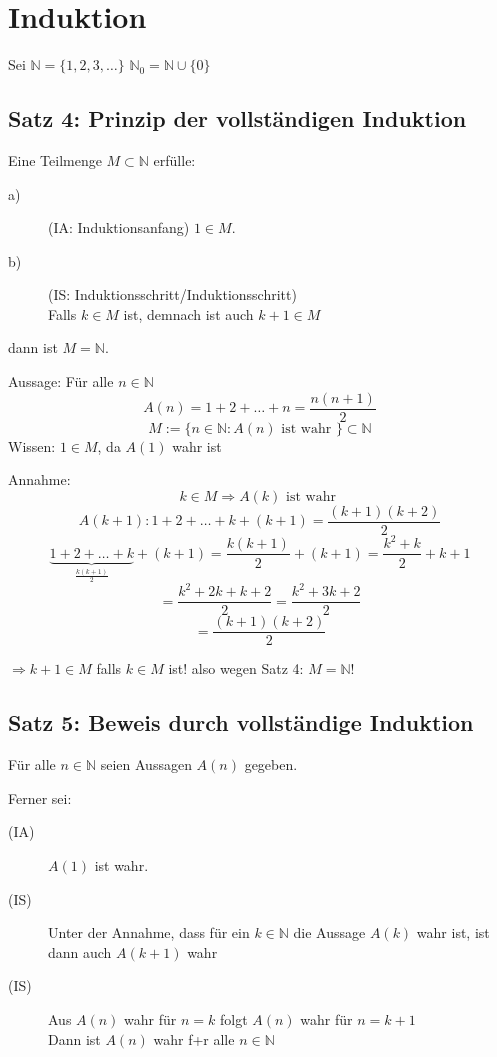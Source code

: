 \documentclass[fleqn]{scrbook}
\newenvironment{example}{{\bfseries Beispiel }}{}
\begin{document}
\section{Induktion}

Sei $\mathbb{N} = \{1,2,3,\ldots\}$
$\mathbb{N}_0=\mathbb{N} \cup \{0\}$

\subsection{Satz 4: Prinzip der vollständigen Induktion}

Eine Teilmenge $M \subset \mathbb{N}$ erfülle:

\begin{description}
 \item[a)] (IA: Induktionsanfang) $1 \in M$.
 \item[b)] (IS: Induktionsschritt/Induktionsschritt) \\
    Falls $k \in M$ ist, demnach ist auch $k+1 \in M$
\end{description}

dann ist $M = \mathbb{N}$.

\begin{example}
Aussage: Für alle $n \in \mathbb{N}$
\[A(n) = 1+2+\ldots+n = \frac{n(n+1)}{2}\]
\[M:=\{n \in \mathbb{N} : A(n) \text{ ist wahr }\} \subset \mathbb{N}\]
Wissen: $1 \in M$, da $A(1)$ wahr ist

Annahme: 
\[k \in M \Longrightarrow A(k) \text{ ist wahr }\]
\[A(k+1):1+2+\ldots+k+(k+1)= \frac{(k+1)(k+2)}{2}\]
\[\underbrace{1+2+\ldots+k}_{\frac{k(k+1)}{2}}+(k+1)= \frac{k(k+1)}{2}+(k+1)=\frac{k^2+k}{2}+k+1\]
\[=\frac{k^2 + 2k + k + 2}{2} = \frac{k^2 + 3k + 2}{2}\]
\[=\frac{(k+1)(k+2)}{2}\]

$\Longrightarrow k+1 \in M$ falls $k \in M$ ist! also wegen Satz 4: $M=\mathbb{N}$!
\end{example}

\subsection{Satz 5: Beweis durch vollständige Induktion}

Für alle $n \in \mathbb{N}$ seien Aussagen $A(n)$ gegeben.

Ferner sei:

\begin{description}
 \item[(IA)] $A(1)$ ist wahr.
 \item[(IS)] Unter der Annahme, dass für ein $k \in \mathbb{N}$ die Aussage $A(k)$ wahr ist, ist dann auch $A(k+1)$ wahr
 \item[(IS)] Aus $A(n)$ wahr für $n=k$ folgt $A(n)$ wahr für $n=k+1$ \\
   Dann ist $A(n)$ wahr f+r alle $n \in \mathbb{N}$
\end{description}
\end{document}
